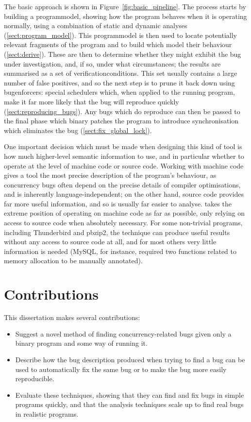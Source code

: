 The basic approach is shown in Figure~\ref{fig:basic_pipeline}.  The
process starts by building a \gls{programmodel}, showing how the
program behaves when it is operating normally, using a combination of
static and dynamic analyses (\autoref{sect:program_model}).  This
\gls{programmodel} is then used to locate potentially relevant fragments
of the program and to build {\StateMachines} which model their
behaviour (\autoref{sect:derive}).  These {\StateMachines} are
then  to determine whether they might
exhibit the bug under investigation, and, if so, under what
circumstances; the results are summarised as a set
of \glspl{verificationcondition}.  This set usually contains a large
number of false positives, and so the next step is to prune it back
down using \glspl{bugenforcer}: special schedulers which, when applied
to the running program, make it far more likely that the bug will
reproduce quickly (\autoref{sect:reproducing_bugs}).  Any bugs which do
reproduce can then be passed to the final 
phase which binary patches the program to introduce synchronisation
which eliminates the bug (\autoref{sect:fix_global_lock}).

One important decision which must be made when designing this kind of
tool is how much higher-level semantic information to use, and in
particular whether to operate at the level of machine code or source
code.  Working with machine code gives a tool the most precise
description of the program's behaviour, as concurrency bugs often
depend on the precise details of compiler optimisations, and is
inherently language-independent; on the other hand, source code
provides far more useful information, and so is usually far easier to
analyse.  {\Technique} takes the extreme position of operating on
machine code as far as possible, only relying on access to source code
when absolutely necessary.  For some non-trivial programs, including
Thunderbird and pbzip2, the technique can produce useful results
without any access to source code at all, and for most others very
little information is needed (MySQL, for instance, required two
functions related to memory allocation to be manually annotated).

\section{Contributions}

This dissertation makes several contributions:

\begin{itemize}
\item
  Suggest a novel method of finding concurrency-related bugs given
  only a binary program and some way of running it.
\item
  Describe how the bug description produced when trying to find a bug
  can be used to automatically fix the same bug or to make the bug
  more easily reproducible.
\item
  Evaluate these techniques, showing that they can find and fix bugs
  in simple programs quickly, and that the analysis techniques scale
  up to find real bugs in realistic programs.
\end{itemize}


